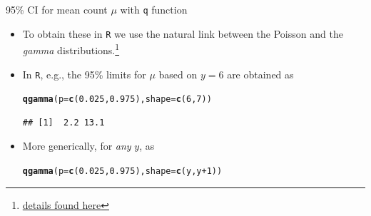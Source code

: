 \documentclass[10pt,handout]{beamer}\usepackage[]{graphicx}\usepackage[]{color}
\makeatletter
\newcommand{\hlnum}[1]{\textcolor[rgb]{0.686,0.059,0.569}{#1}}%
\newcommand{\hlopt}[1]{\textcolor[rgb]{0,0,0}{#1}}%
\newcommand{\hlstd}[1]{\textcolor[rgb]{0.345,0.345,0.345}{#1}}%
\newcommand{\hlkwc}[1]{\textcolor[rgb]{0.333,0.667,0.333}{#1}}%
\newcommand{\hlkwd}[1]{\textcolor[rgb]{0.737,0.353,0.396}{\textbf{#1}}}%
\newenvironment{kframe}{%
 \def\at@end@of@kframe{}%
 \ifinner\ifhmode%
  \def\at@end@of@kframe{\end{minipage}}%
  \begin{minipage}{\columnwidth}%
 \fi\fi%
 \def\FrameCommand##1{\hskip\@totalleftmargin \hskip-\fboxsep
 \colorbox{shadecolor}{##1}\hskip-\fboxsep
     \hskip-\linewidth \hskip-\@totalleftmargin \hskip\columnwidth}%
 \MakeFramed {\advance\hsize-\width
   \@totalleftmargin\z@ \linewidth\hsize
   \@setminipage}}%
 {\par\unskip\endMakeFramed%
 \at@end@of@kframe}
\newenvironment{knitrout}{}{} %
\makeatother
\begin{document}
\begin{frame}[fragile]{95\% CI for mean count $\mu$ with \texttt{q} function}
	\begin{itemize}
		\setlength\itemsep{1em}
		\item To obtain these in \texttt{R}	we use the  natural link between the Poisson and  the \textit{gamma} 
		distributions.\footnote{
			{ \tiny \href{http://www.epi.mcgill.ca/hanley/bios601/Mean-Quantile/forAccromathBackTranslate.pdf}{details found here} }} 
		\item In \texttt{R}, e.g., the 95\% limits for $\mu$ based on $y=6$ are obtained as 
		
\begin{knitrout}\tiny
{}\color{fgcolor}\begin{kframe}
\begin{alltt}
\hlkwd{qgamma}\hlstd{(}\hlkwc{p} \hlstd{=} \hlkwd{c}\hlstd{(}\hlnum{0.025}\hlstd{,}\hlnum{0.975}\hlstd{),} \hlkwc{shape} \hlstd{=} \hlkwd{c}\hlstd{(}\hlnum{6}\hlstd{,} \hlnum{7}\hlstd{))}
\end{alltt}
\begin{verbatim}
## [1]  2.2 13.1
\end{verbatim}
\end{kframe}
\end{knitrout}
		
		\item More generically, for \textit{any} $y$, as
		
\begin{knitrout}\tiny
{}\color{fgcolor}\begin{kframe}
\begin{alltt}
\hlkwd{qgamma}\hlstd{(}\hlkwc{p} \hlstd{=} \hlkwd{c}\hlstd{(}\hlnum{0.025}\hlstd{,}\hlnum{0.975}\hlstd{),} \hlkwc{shape} \hlstd{=} \hlkwd{c}\hlstd{(y, y}\hlopt{+}\hlnum{1}\hlstd{))}
\end{alltt}
\end{kframe}
\end{knitrout}
		
	\end{itemize}
\end{frame}
\end{document}
